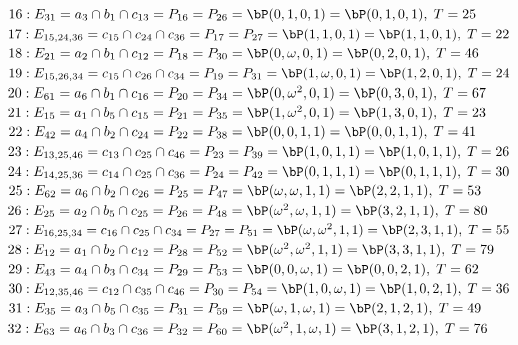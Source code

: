 $16 : E_{31}=a_{3} \cap b_{1} \cap c_{13} = P_{16} = P_{26}=\bP(0, 1, 0, 1) = \bP(0, 1, 0, 1),\; T= 25$\\
$17 : E_{15,24,36}=c_{15} \cap c_{24} \cap c_{36} = P_{17} = P_{27}=\bP(1, 1, 0, 1) = \bP(1, 1, 0, 1),\; T= 22$\\
$18 : E_{21}=a_{2} \cap b_{1} \cap c_{12} = P_{18} = P_{30}=\bP(0, \omega , 0, 1) = \bP(0, 2, 0, 1),\; T= 46$\\
$19 : E_{15,26,34}=c_{15} \cap c_{26} \cap c_{34} = P_{19} = P_{31}=\bP(1, \omega , 0, 1) = \bP(1, 2, 0, 1),\; T= 24$\\
$20 : E_{61}=a_{6} \cap b_{1} \cap c_{16} = P_{20} = P_{34}=\bP(0, \omega^{2}, 0, 1) = \bP(0, 3, 0, 1),\; T= 67$\\
$21 : E_{15}=a_{1} \cap b_{5} \cap c_{15} = P_{21} = P_{35}=\bP(1, \omega^{2}, 0, 1) = \bP(1, 3, 0, 1),\; T= 23$\\
$22 : E_{42}=a_{4} \cap b_{2} \cap c_{24} = P_{22} = P_{38}=\bP(0, 0, 1, 1) = \bP(0, 0, 1, 1),\; T= 41$\\
$23 : E_{13,25,46}=c_{13} \cap c_{25} \cap c_{46} = P_{23} = P_{39}=\bP(1, 0, 1, 1) = \bP(1, 0, 1, 1),\; T= 26$\\
$24 : E_{14,25,36}=c_{14} \cap c_{25} \cap c_{36} = P_{24} = P_{42}=\bP(0, 1, 1, 1) = \bP(0, 1, 1, 1),\; T= 30$\\
$25 : E_{62}=a_{6} \cap b_{2} \cap c_{26} = P_{25} = P_{47}=\bP(\omega , \omega , 1, 1) = \bP(2, 2, 1, 1),\; T= 53$\\
$26 : E_{25}=a_{2} \cap b_{5} \cap c_{25} = P_{26} = P_{48}=\bP(\omega^{2}, \omega , 1, 1) = \bP(3, 2, 1, 1),\; T= 80$\\
$27 : E_{16,25,34}=c_{16} \cap c_{25} \cap c_{34} = P_{27} = P_{51}=\bP(\omega , \omega^{2}, 1, 1) = \bP(2, 3, 1, 1),\; T= 55$\\
$28 : E_{12}=a_{1} \cap b_{2} \cap c_{12} = P_{28} = P_{52}=\bP(\omega^{2}, \omega^{2}, 1, 1) = \bP(3, 3, 1, 1),\; T= 79$\\
$29 : E_{43}=a_{4} \cap b_{3} \cap c_{34} = P_{29} = P_{53}=\bP(0, 0, \omega , 1) = \bP(0, 0, 2, 1),\; T= 62$\\
$30 : E_{12,35,46}=c_{12} \cap c_{35} \cap c_{46} = P_{30} = P_{54}=\bP(1, 0, \omega , 1) = \bP(1, 0, 2, 1),\; T= 36$\\
$31 : E_{35}=a_{3} \cap b_{5} \cap c_{35} = P_{31} = P_{59}=\bP(\omega , 1, \omega , 1) = \bP(2, 1, 2, 1),\; T= 49$\\
$32 : E_{63}=a_{6} \cap b_{3} \cap c_{36} = P_{32} = P_{60}=\bP(\omega^{2}, 1, \omega , 1) = \bP(3, 1, 2, 1),\; T= 76$\\
